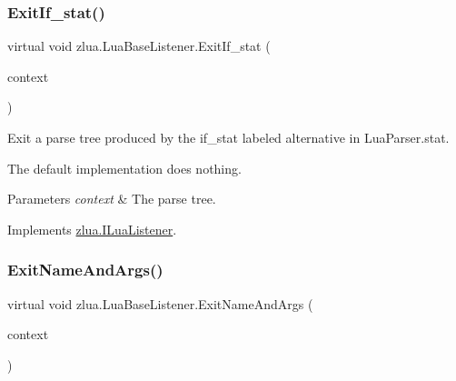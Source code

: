 \mbox{\label{classzlua_1_1_lua_base_listener_aadcd2b60bcec7dda7b397a674e1d6082}} 
\subsubsection{\texorpdfstring{Exit\+If\+\_\+stat()}{ExitIf\_stat()}}
{\footnotesize\ttfamily virtual void zlua.\+Lua\+Base\+Listener.\+Exit\+If\+\_\+stat (\begin{DoxyParamCaption}\item[{\mbox{[}\+Not\+Null\mbox{]} \mbox{\hyperlink{classzlua_1_1_lua_parser_1_1_if__stat_context}{Lua\+Parser.\+If\+\_\+stat\+Context}}}]{context }\end{DoxyParamCaption})\hspace{0.3cm}{\ttfamily [virtual]}}



Exit a parse tree produced by the {\ttfamily if\+\_\+stat} labeled alternative in Lua\+Parser.\+stat. 

The default implementation does nothing.


\begin{DoxyParams}{Parameters}
{\em context} & The parse tree.\\
\hline
\end{DoxyParams}


Implements \mbox{\hyperlink{interfacezlua_1_1_i_lua_listener_a2f0389129d1846cafed21b068ecdb15d}{zlua.\+I\+Lua\+Listener}}.

\mbox{\label{classzlua_1_1_lua_base_listener_ae26d62193f8285daad3361d083e45c58}} 
\subsubsection{\texorpdfstring{Exit\+Name\+And\+Args()}{ExitNameAndArgs()}}
{\footnotesize\ttfamily virtual void zlua.\+Lua\+Base\+Listener.\+Exit\+Name\+And\+Args (\begin{DoxyParamCaption}\item[{\mbox{[}\+Not\+Null\mbox{]} \mbox{\hyperlink{classzlua_1_1_lua_parser_1_1_name_and_args_context}{Lua\+Parser.\+Name\+And\+Args\+Context}}}]{context }\end{DoxyParamCaption})\hspace{0.3cm}{\ttfamily [virtual]}}



